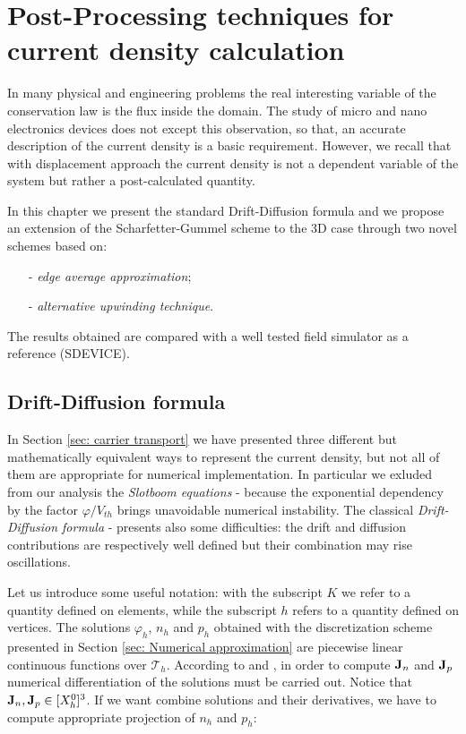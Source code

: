 \chapter{Post-Processing techniques for current density calculation}
\label{chap: postprocess}

In many physical and engineering problems the real interesting variable of the conservation law is the flux inside the domain. The study of micro and nano electronics devices does not except this observation, so that, an accurate description of the current density is a basic requirement.
However, we recall that with displacement approach the current density is not a dependent variable of the system but rather a post-calculated quantity.

In this chapter we present the standard Drift-Diffusion formula and we propose an extension of the Scharfetter-Gummel scheme \cite{Gummel:SignAnalys} to the 3D case through two novel schemes based on:
\begin{itemize}
\item[-] \textit{edge average approximation};
\item[-] \textit{alternative upwinding technique}.   
\end{itemize}

The results obtained are compared with a well tested field simulator as a reference (SDEVICE).

\section{Drift-Diffusion formula}

In Section \ref{sec: carrier transport} we have presented three different but mathematically equivalent ways to represent the current density, but not all of them are appropriate for numerical implementation. In particular we exluded from our analysis the \textit{Slotboom equations} - because  the exponential dependency by the factor $\varphi / V_{th}$ brings unavoidable numerical instability. 
The classical \textit{Drift-Diffusion formula} - presents also some difficulties: the drift and diffusion contributions are respectively well defined but their combination may rise oscillations.

Let us introduce some useful notation: with the subscript $K$  we refer to a quantity defined on elements, while the subscript $h$ refers to a quantity defined on vertices. The solutions $\varphi_h$, $n_h$ and $p_h$ obtained with the discretization scheme presented in Section \ref{sec: Numerical approximation} are piecewise linear continuous functions over $\mathcal{T}_h$. According to   and ,  in order to compute $\mathbf{J}_n$ and $\mathbf{J}_p$ numerical differentiation of the solutions must be carried out. Notice that $\mathbf{J}_{n},\mathbf{J}_{p} \in [X_h^0]^3$. If we want combine solutions and their derivatives, we have to compute appropriate projection of $n_h$ and $p_h$:
 
